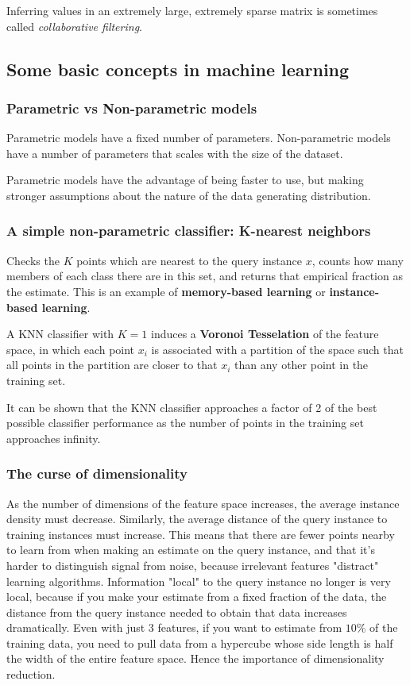 \documentclass[11pt]{article}
\theoremstyle{definition}
\begin{document}
                Inferring values in an extremely large, extremely sparse matrix is sometimes called \emph{collaborative filtering}.
    \subsection{Some basic concepts in machine learning}
        \subsubsection{Parametric vs Non-parametric models}
            Parametric models have a fixed number of parameters. Non-parametric models have a number of parameters that scales with the size of the dataset.

            Parametric models have the advantage of being faster to use, but making stronger assumptions about the nature of the data generating distribution.

        \subsubsection{A simple non-parametric classifier: K-nearest neighbors}
            Checks the $K$ points which are nearest to the query instance $x$, counts how many members of each class there are in this set, and returns that empirical fraction as the estimate. This is an example of \textbf{memory-based learning} or \textbf{instance-based learning}.

            A KNN classifier with $K=1$ induces a \textbf{Voronoi Tesselation} of the feature space, in which each point $x_i$ is associated with a partition of the space such that all points in the partition are closer to that $x_i$ than any other point in the training set.

            It can be shown that the KNN classifier approaches a factor of 2 of the best possible classifier performance as the number of points in the training set approaches infinity.

        \subsubsection{The curse of dimensionality}
            As the number of dimensions of the feature space increases, the average instance density must decrease. Similarly, the average distance of the query instance to training instances must increase. This means that there are fewer points nearby to learn from when making an estimate on the query instance, and that it's harder to distinguish signal from noise, because irrelevant features "distract" learning algorithms. Information "local" to the query instance no longer is very local, because if you make your estimate from a fixed fraction of the data, the distance from the query instance needed to obtain that data increases dramatically. Even with just 3 features, if you want to estimate from $10\%$ of the training data, you need to pull data from a hypercube whose side length is half the width of the entire feature space. Hence the importance of dimensionality reduction.
\end{document}
